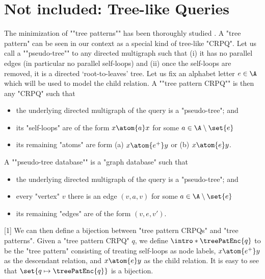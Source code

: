\section{Not included: Tree-like Queries}

The minimization of ""tree patterns"" has been thoroughly studied \cite{CzerwinskiMartensNiewerthParys2018Minimization}. 
A "tree pattern" can be seen in our context as a special kind of tree-like "CRPQ". Let us call a \AP""pseudo-tree"" to any directed multigraph such that (i) it has no parallel edges (in particular no parallel self-loops) and (ii) once the self-loops are removed, it is a directed `root-to-leaves' tree.
Let us fix an alphabet letter $e \in \A$ which will be used to model the child relation.
A \AP""tree pattern CRPQ"" is then any "CRPQ" such that
\begin{itemize}
  \item the underlying directed multigraph of the query is a "pseudo-tree"; and
  \item its "self-loops" are of the form $x \atom{a} x$ for some $a \in \A \setminus \set{e}$
  \item its remaining "atoms" are form (a) $x \atom{e^+} y$ or (b) $x \atom{e} y$.
\end{itemize}
A \AP""pseudo-tree database"" is a "graph database" such that
\begin{itemize}
  \item the underlying directed multigraph of the query is a "pseudo-tree"; and
  \item every "vertex" $v$ there is an edge $(v,a,v)$ for some $a \in \A \setminus \set{e}$
  \item its remaining "edges" are of the form $(v,e,v')$.
\end{itemize}

\knowledgenewrobustcmd{\treePatEnc}[1]{}
We can then define a bijection between "tree pattern CRPQs" and "tree patterns". Given a "tree pattern CRPQ" $q$, we define $\intro*\treePatEnc{q}$ to be the "tree pattern" consisting of treating self-loops as node labels, $x \atom{e^+} y$ as the descendant relation, and $x \atom{e} y$ as the child relation. It is easy to see that $\set{q \mapsto \treePatEnc{q}}$ is a bijection. 


